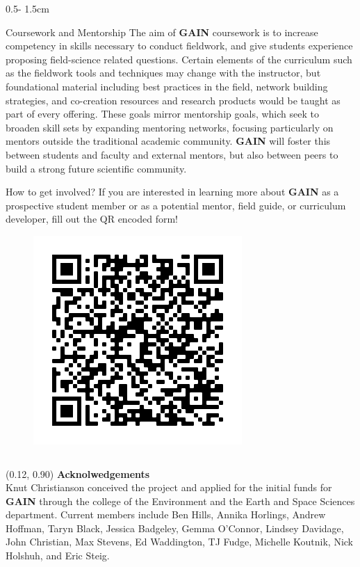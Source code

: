 \documentclass{uwposter}
\begin{document}
\begin{frame}
\begin{columns}[onlytextwidth]
\begin{column}{0.5\textwidth - 1.5cm}
    \begin{block}{Coursework and Mentorship}
        The aim of  \textbf{\alert{GAIN}} coursework is to increase competency in skills necessary to conduct fieldwork, and give students experience proposing field-science related questions. Certain elements of the curriculum such as the fieldwork tools and techniques may change with the instructor, but foundational material including best practices in the field, network building strategies, and co-creation resources and research products would be taught as part of every offering. These goals mirror mentorship goals, which seek to broaden skill sets by expanding mentoring networks, focusing particularly on mentors outside the traditional academic community. \textbf{\alert{GAIN}}  will foster this between students and faculty and external mentors, but also between peers to build a strong future scientific community. 

    \end{block}
    
    \begin{alertblock}{How to get involved?}
        If you are interested in learning more about \textbf{\alert{GAIN}} as a prospective student member or as a potential mentor, field guide, or curriculum developer, fill out the QR encoded form!
        \begin{figure}
        \includegraphics[width=.4\linewidth]{uwposter-images/frame.png}
        \label{fig:qrcode}
        \end{figure}
        
    \end{alertblock}
    
    
    \end{column}


\end{columns}


\begin{textblock}{0.76}(0.12, 0.90)
    \color{white}
    \sffamily
    \textbf{Acknolwedgements}
    \\
    Knut Christianson conceived the project and applied for the initial funds for \textbf{\alert{GAIN}} through the college of the Environment and the Earth and Space Sciences department.  
    Current members include Ben Hills, Annika Horlings, Andrew Hoffman, Taryn Black, Jessica Badgeley, Gemma O'Connor, Lindsey Davidage, John Christian,  Max Stevens, Ed Waddington, TJ Fudge, Michelle Koutnik, Nick Holshuh, and Eric Steig.
    \end{textblock}


\end{frame}
\end{document}

